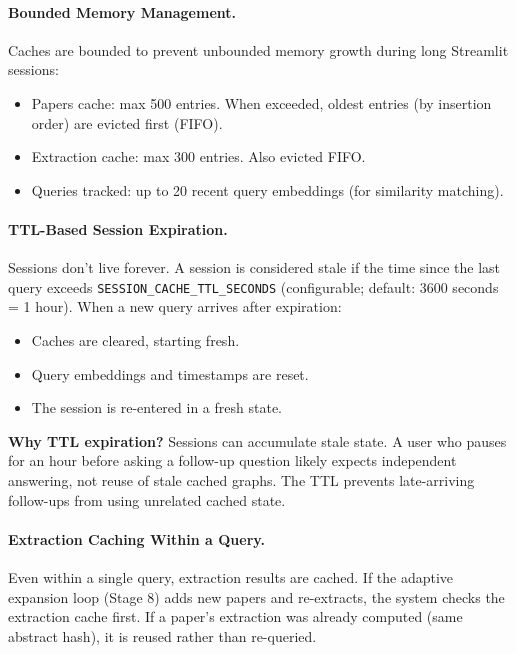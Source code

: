 \documentclass[11pt]{article}
\begin{document}
\paragraph{Bounded Memory Management.} Caches are bounded to prevent unbounded memory growth during long Streamlit sessions:

\begin{itemize}[leftmargin=1.2em]
  \item Papers cache: max 500 entries. When exceeded, oldest entries (by insertion order) are evicted first (FIFO).
  \item Extraction cache: max 300 entries. Also evicted FIFO.
  \item Queries tracked: up to 20 recent query embeddings (for similarity matching).
\end{itemize}

\paragraph{TTL-Based Session Expiration.} Sessions don't live forever. A session is considered stale if the time since the last query exceeds \texttt{SESSION\_CACHE\_TTL\_SECONDS} (configurable; default: 3600 seconds = 1 hour). When a new query arrives after expiration:

\begin{itemize}[leftmargin=1.2em]
  \item Caches are cleared, starting fresh.
  \item Query embeddings and timestamps are reset.
  \item The session is re-entered in a fresh state.
\end{itemize}

\textbf{Why TTL expiration?} Sessions can accumulate stale state. A user who pauses for an hour before asking a follow-up question likely expects independent answering, not reuse of stale cached graphs. The TTL prevents late-arriving follow-ups from using unrelated cached state.

\paragraph{Extraction Caching Within a Query.} Even within a single query, extraction results are cached. If the adaptive expansion loop (Stage 8) adds new papers and re-extracts, the system checks the extraction cache first. If a paper's extraction was already computed (same abstract hash), it is reused rather than re-queried.
\end{document}
